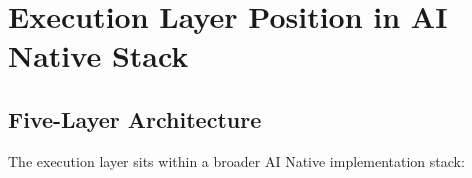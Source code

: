 \section{Execution Layer Position in AI Native Stack}

\subsection{Five-Layer Architecture}

The execution layer sits within a broader AI Native implementation stack:

